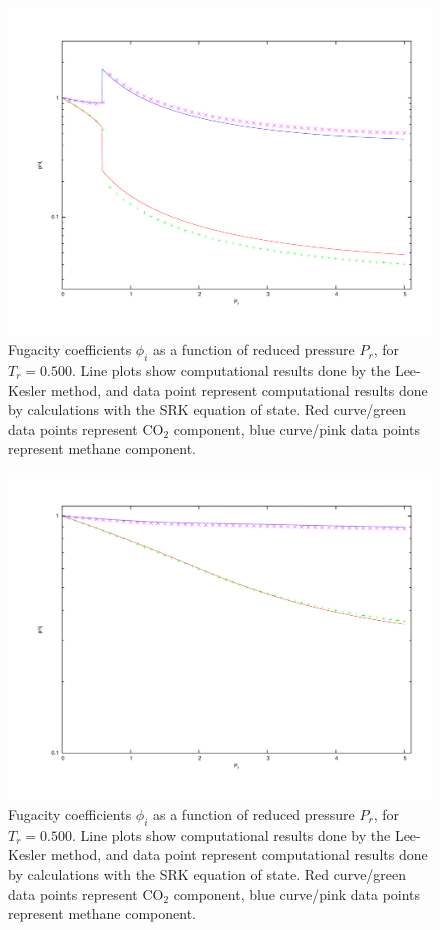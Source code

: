\documentclass[english]{../thermomemo/thermomemo}
\numberwithin{equation}{section}
\begin{document}
\begin{figure}
	\centering
	\includegraphics[trim = 1.5cm 2cm 0 1cm, clip = true, width=12.5cm]{fug09Tc}
	\caption{Fugacity coefficients $\phi_i$ as a function of reduced pressure $P_r$, for $T_r = 0.500$. Line plots show computational results done by the Lee-Kesler method, and data point represent computational results done by calculations with the SRK equation of state. Red curve/green data points represent CO$_2$ component, blue curve/pink data points represent methane component.}
		\label{fig:fug09Tc}
\end{figure}

\begin{figure}
	\centering
	\includegraphics[trim = 1.5cm 2cm 0 1cm, clip = true, width=12.5cm]{fug13Tc}
	\caption{Fugacity coefficients $\phi_i$ as a function of reduced pressure $P_r$, for $T_r = 0.500$. Line plots show computational results done by the Lee-Kesler method, and data point represent computational results done by calculations with the SRK equation of state. Red curve/green data points represent CO$_2$ component, blue curve/pink data points represent methane component.}
	\label{fig:fug13Tc}
\end{figure}
\end{document}
